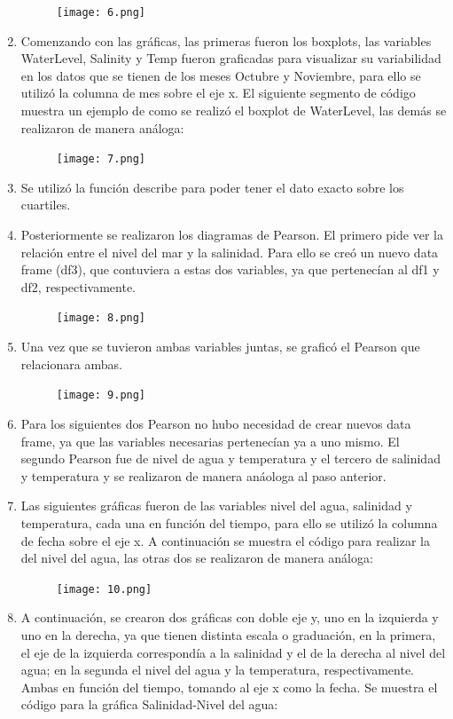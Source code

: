 \documentclass[12pt]{article}
\begin{document}
\begin{enumerate}
\begin{figure}[h!]
  \texttt{[image: 6.png]}
  \centering
  \label{fig:6}
\end{figure}
\item Comenzando con las gráficas, las primeras fueron los boxplots, las variables WaterLevel, Salinity y Temp fueron graficadas para visualizar su variabilidad en los datos que se tienen de los meses Octubre y Noviembre, para ello se utilizó la columna de mes sobre el eje x. El siguiente segmento de código muestra un ejemplo de como se realizó el boxplot de WaterLevel, las demás se realizaron de manera análoga: 
\begin{figure}[h!]
  \texttt{[image: 7.png]}
  \centering
  \label{fig:7}
\end{figure}
\item Se utilizó la función describe para poder tener el dato exacto sobre los cuartiles.
\item Posteriormente se realizaron los diagramas de Pearson. El primero pide ver la relación entre el nivel del mar y la salinidad. Para ello se creó un nuevo data frame (df3), que contuviera a estas dos variables, ya que pertenecían al df1 y df2, respectivamente. 
\begin{figure}[h!]
  \texttt{[image: 8.png]}
  \centering
  \label{fig:8}
\end{figure}
\item Una vez que se tuvieron ambas variables juntas, se graficó el Pearson que relacionara ambas. 
\begin{figure}[h!]
  \texttt{[image: 9.png]}
  \centering
  \label{fig:9}
\end{figure}
\item Para los siguientes dos Pearson no hubo necesidad de crear nuevos data frame, ya que las variables necesarias pertenecían ya a uno mismo. El segundo Pearson fue de nivel de agua y temperatura y el tercero de salinidad y temperatura y se realizaron de manera anáologa al paso anterior.
\item Las siguientes gráficas fueron de las variables nivel del agua, salinidad y temperatura, cada una en función del tiempo, para ello se utilizó la columna de fecha sobre el eje x. A continuación se muestra el código para realizar la del nivel del agua, las otras dos se realizaron de manera análoga: 
\begin{figure}[h!]
  \texttt{[image: 10.png]}
  \centering
  \label{fig:10}
\end{figure}
\item A continuación, se crearon dos gráficas con doble eje y, uno en la izquierda y uno en la derecha, ya que tienen distinta escala o graduación, en la primera, el eje de la izquierda correspondía a la salinidad y el de la derecha al nivel del agua; en la segunda el nivel del agua y la temperatura, respectivamente. Ambas en función del tiempo, tomando al eje x como la fecha. Se muestra el código para la gráfica Salinidad-Nivel del agua:

\end{enumerate}
\end{document}
